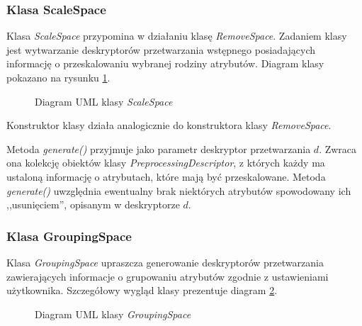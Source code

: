 \documentclass[../thesis.tex]{subfiles}
\begin{document}
\subsubsection{Klasa ScaleSpace}

Klasa \emph{ScaleSpace} przypomina w działaniu klasę \emph{RemoveSpace}. Zadaniem klasy jest wytwarzanie deskryptorów przetwarzania wstępnego posiadających informację o przeskalowaniu wybranej rodziny atrybutów. Diagram klasy pokazano na rysunku \ref{proj:diagram_scale_space}.

\begin{figure}[h]
\centering
{}
\caption{Diagram UML klasy \emph{ScaleSpace}}
\label{proj:diagram_scale_space}
\end{figure}

Konstruktor klasy działa analogicznie do konstruktora klasy \emph{RemoveSpace}. 

Metoda \emph{generate()} przyjmuje jako parametr deskryptor przetwarzania $d$. Zwraca ona kolekcję obiektów klasy \emph{PreprocessingDescriptor}, z których każdy ma ustaloną informację o atrybutach, które mają być przeskalowane. Metoda \emph{generate()} uwzględnia ewentualny brak niektórych atrybutów spowodowany ich ,,usunięciem'', opisanym w deskryptorze $d$.

\subsubsection{Klasa GroupingSpace}

Klasa \emph{GroupingSpace} upraszcza generowanie deskryptorów przetwarzania zawierających informacje o grupowaniu atrybutów zgodnie z ustawieniami użytkownika. Szczegółowy wygląd klasy prezentuje diagram \ref{proj:diagram_grouping_space}.

\begin{figure}[h]
\centering
{}
\caption{Diagram UML klasy \emph{GroupingSpace}}
\label{proj:diagram_grouping_space}
\end{figure}
\end{document}
